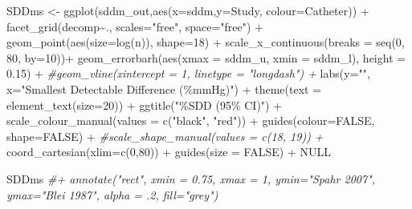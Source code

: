 \documentclass[
]{article}
\newenvironment{Shaded}{\begin{snugshade}}{\end{snugshade}}
\newcommand{\AttributeTok}[1]{\textcolor[rgb]{0.77,0.63,0.00}{#1}}
\newcommand{\CommentTok}[1]{\textcolor[rgb]{0.56,0.35,0.01}{\textit{#1}}}
\newcommand{\ConstantTok}[1]{\textcolor[rgb]{0.00,0.00,0.00}{#1}}
\newcommand{\DecValTok}[1]{\textcolor[rgb]{0.00,0.00,0.81}{#1}}
\newcommand{\FloatTok}[1]{\textcolor[rgb]{0.00,0.00,0.81}{#1}}
\newcommand{\FunctionTok}[1]{\textcolor[rgb]{0.00,0.00,0.00}{#1}}
\newcommand{\NormalTok}[1]{#1}
\newcommand{\OtherTok}[1]{\textcolor[rgb]{0.56,0.35,0.01}{#1}}
\newcommand{\SpecialCharTok}[1]{\textcolor[rgb]{0.00,0.00,0.00}{#1}}
\newcommand{\StringTok}[1]{\textcolor[rgb]{0.31,0.60,0.02}{#1}}
\begin{document}
\begin{Shaded}
\begin{Highlighting}[]
\NormalTok{SDDms }\OtherTok{\textless{}{-}} \FunctionTok{ggplot}\NormalTok{(sddm\_out,}\FunctionTok{aes}\NormalTok{(}\AttributeTok{x=}\NormalTok{sddm,}\AttributeTok{y=}\NormalTok{Study, }
                           \AttributeTok{colour=}\NormalTok{Catheter)) }\SpecialCharTok{+}
  \FunctionTok{facet\_grid}\NormalTok{(decomp}\SpecialCharTok{\textasciitilde{}}\NormalTok{., }\AttributeTok{scales=}\StringTok{"free"}\NormalTok{, }\AttributeTok{space=}\StringTok{"free"}\NormalTok{) }\SpecialCharTok{+}
  \FunctionTok{geom\_point}\NormalTok{(}\FunctionTok{aes}\NormalTok{(}\AttributeTok{size=}\FunctionTok{log}\NormalTok{(n)), }\AttributeTok{shape=}\DecValTok{18}\NormalTok{) }\SpecialCharTok{+} 
  \FunctionTok{scale\_x\_continuous}\NormalTok{(}\AttributeTok{breaks =} \FunctionTok{seq}\NormalTok{(}\DecValTok{0}\NormalTok{, }\DecValTok{80}\NormalTok{, }\AttributeTok{by=}\DecValTok{10}\NormalTok{))}\SpecialCharTok{+}
  \FunctionTok{geom\_errorbarh}\NormalTok{(}\FunctionTok{aes}\NormalTok{(}\AttributeTok{xmax =}\NormalTok{ sddm\_u, }\AttributeTok{xmin =}\NormalTok{ sddm\_l), }\AttributeTok{height =} \FloatTok{0.15}\NormalTok{) }\SpecialCharTok{+}
  \CommentTok{\#geom\_vline(xintercept = 1, linetype = "longdash") +}
  \FunctionTok{labs}\NormalTok{(}\AttributeTok{y=}\StringTok{""}\NormalTok{, }\AttributeTok{x=}\StringTok{"Smallest Detectable Difference (\%mmHg)"}\NormalTok{) }\SpecialCharTok{+}
  \FunctionTok{theme}\NormalTok{(}\AttributeTok{text =} \FunctionTok{element\_text}\NormalTok{(}\AttributeTok{size=}\DecValTok{20}\NormalTok{)) }\SpecialCharTok{+}
  \FunctionTok{ggtitle}\NormalTok{(}\StringTok{"\%SDD (95\% CI)"}\NormalTok{) }\SpecialCharTok{+}
  \FunctionTok{scale\_colour\_manual}\NormalTok{(}\AttributeTok{values =} \FunctionTok{c}\NormalTok{(}\StringTok{"black"}\NormalTok{, }\StringTok{"red"}\NormalTok{)) }\SpecialCharTok{+}
  \FunctionTok{guides}\NormalTok{(}\AttributeTok{colour=}\ConstantTok{FALSE}\NormalTok{, }\AttributeTok{shape=}\ConstantTok{FALSE}\NormalTok{) }\SpecialCharTok{+}
  \CommentTok{\#scale\_shape\_manual(values = c(18, 19)) +}
  \FunctionTok{coord\_cartesian}\NormalTok{(}\AttributeTok{xlim=}\FunctionTok{c}\NormalTok{(}\DecValTok{0}\NormalTok{,}\DecValTok{80}\NormalTok{)) }\SpecialCharTok{+}
  \FunctionTok{guides}\NormalTok{(}\AttributeTok{size =} \ConstantTok{FALSE}\NormalTok{) }\SpecialCharTok{+}
  \ConstantTok{NULL}

\NormalTok{SDDms  }\CommentTok{\#+ annotate("rect", xmin = 0.75, xmax = 1, ymin="Spahr 2007", ymax="Blei 1987", alpha = .2, fill="grey")}
\end{Highlighting}
\end{Shaded}
\end{document}
